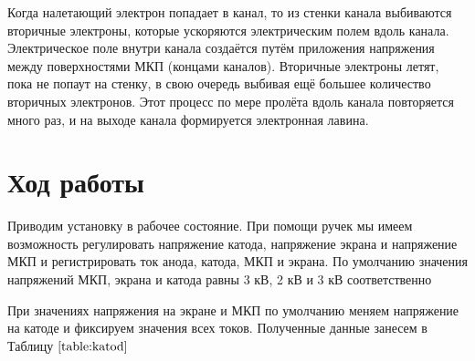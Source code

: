\documentclass[a4paper,12pt]{article}
\begin{document}
Когда налетающий электрон попадает в канал, то из стенки канала выбиваются вторичные электроны, которые ускоряются электрическим полем вдоль канала. Электрическое поле внутри канала создаётся путём приложения напряжения между поверхностями МКП (концами каналов). Вторичные электроны летят, пока не попаут на стенку, в свою очередь выбивая ещё большее количество вторичных электронов. Этот процесс по мере пролёта вдоль канала повторяется много раз, и на выходе канала формируется электронная лавина.

\section*{Ход работы}

Приводим установку в рабочее состояние. При помощи ручек мы имеем возможность регулировать напряжение катода, напряжение экрана и напряжение МКП и регистрировать ток анода, катода, МКП и экрана. По умолчанию значения напряжений МКП, экрана и катода равны 3 кВ, 2 кВ и 3 кВ соответственно

При значениях напряжения на экране и МКП по умолчанию меняем напряжение на катоде и фиксируем значения всех токов. Полученные данные занесем в Таблицу $\ref{table:katod}$
\end{document}
